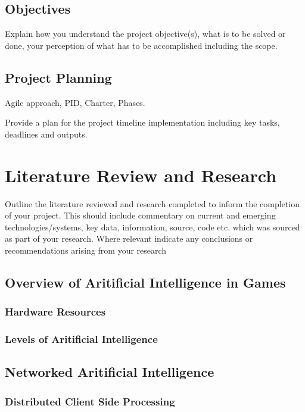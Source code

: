 \documentclass[12pt,a4paper,titlepage]{article}
\begin{document}
\subsection{Objectives}
Explain how you understand the project objective(s), what is to be solved or done, your perception of what has to be accomplished including the scope. 

\subsection{Project Planning}
Agile approach, PID, Charter, Phases.

Provide a plan for the project timeline implementation including key tasks, deadlines and outputs.

\section{Literature Review and Research}
Outline the literature reviewed and research completed to inform the completion of your project.  This should include commentary on current and emerging technologies/systems, key data, information, source, code etc. which was sourced as part of your research.  Where relevant indicate any conclusions or recommendations arising from your research

\subsection{Overview of Aritificial Intelligence in Games}

\subsubsection{Hardware Resources}

\subsubsection{Levels of Aritificial Intelligence}

\subsection{Networked Aritificial Intelligence}

\subsubsection{Distributed Client Side Processing}
\end{document}
